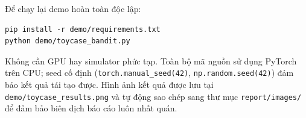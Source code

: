 Để chạy lại demo hoàn toàn độc lập:
\begin{verbatim}
pip install -r demo/requirements.txt
python demo/toycase_bandit.py
\end{verbatim}
Không cần GPU hay simulator phức tạp. Toàn bộ mã nguồn sử dụng PyTorch trên
CPU; seed cố định (\texttt{torch.manual\_seed(42)}, \texttt{np.random.seed(42)})
đảm bảo kết quả tái tạo được. Hình ảnh kết quả được lưu tại
\texttt{demo/toycase\_results.png} và tự động sao chép sang thư mục
\texttt{report/images/} để đảm bảo biên dịch báo cáo luôn nhất quán.